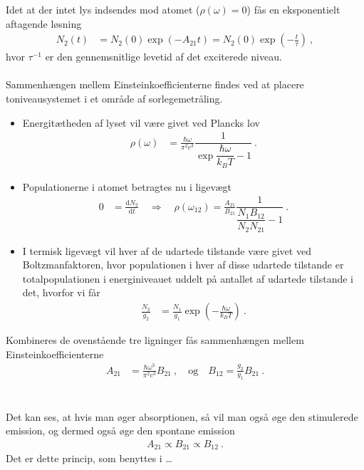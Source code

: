Idet at der intet lys indsendes mod atomet ($\rho(\omega) = 0$) fås en eksponentielt aftagende løsning
\begin{align*}
    N_2(t) &= N_2(0)\exp(-A_{21}t) = N_2(0)\exp\left(-\frac{t}{\tau}\right) \: ,
\end{align*}
hvor $\tau^{-1}$ er den gennemsnitlige levetid af det exciterede niveau.\\\\
%
Sammenhængen mellem Einsteinkoefficienterne findes ved at placere toniveausystemet i et område af sorlegemetråling.
\begin{itemize}
    \item Energitætheden af lyset vil være givet ved Plancks lov
    \begin{align*}
        \rho(\omega) &= \frac{\hbar\omega}{\pi^2c^3} \dfrac{1}{\exp{\dfrac{\hbar\omega}{k_B T}} - 1} \: .
    \end{align*}
    \item Populationerne i atomet betragtes nu i ligevægt
    \begin{align*}
        0 &= \frac{\text{d} N_2}{\text{d} t} \quad \Rightarrow \quad \rho(\omega_{12}) = \frac{A_{21}}{B_{21}} \dfrac{1}{\dfrac{N_1 B_{12}}{N_2 N_{21}} - 1} \: .
    \end{align*}
    \item I termisk ligevægt vil hver af de udartede tilstande være givet ved Boltzmanfaktoren, hvor populationen i hver af disse udartede tilstande er totalpopulationen i energiniveauet uddelt på antallet af udartede tilstande i det, hvorfor vi får
    \begin{align*}
        \frac{N_2}{g_2} &= \frac{N_1}{g_1}\exp\left(-\frac{\hbar \omega}{k_B T}\right) \: .
    \end{align*}
\end{itemize}
Kombineres de ovenstående tre ligninger fås sammenhængen mellem Einsteinkoefficienterne
\begin{align*}
    A_{21} & =\frac{\hbar\omega^3}{\pi^2c^3} B_{21} \: , \quad \text{og} \quad B_{12} = \frac{g_2}{g_1} B_{21} \: .
\end{align*}\\\\
%
Det kan ses, at hvis man øger absorptionen, så vil man også øge den stimulerede emission, og dermed også øge den spontane emission
\begin{align*}
    A_{21} \propto B_{21} \propto B_{12} \: .
\end{align*}
Det er dette princip, som benyttes i \ldots
\normalsize